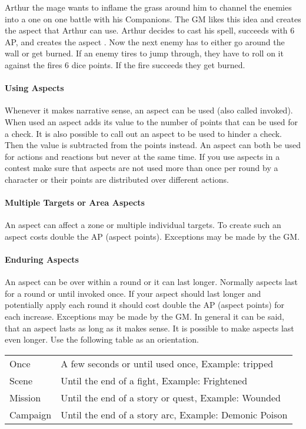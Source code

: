 \documentclass[11pt]{article}
\begin{document}
{\begin{pwexample}
Arthur the mage wants to inflame the grass around him to channel the enemies into a one on one battle with his Companions. The GM likes this idea and creates the aspect  that Arthur can use. Arthur decides to cast his spell, succeeds with 6 AP, and creates the aspect . Now the next enemy has to either go around the wall or get burned. If an enemy tires to jump through, they have to roll on it against the fires 6 dice points. If the fire succeeds they get burned.
\end{pwexample}
\paragraph*{Using Aspects}
\label{sec:orgc93d6cd}

Whenever it makes narrative sense, an aspect can be used (also called invoked). When used an aspect adds its value to the number of points that can be used for a check. It is also possible to call out an aspect to be used to hinder a check. Then the value is subtracted from the points instead. An aspect can both be used for actions and reactions but never at the same time. If you use  aspects in a contest make sure that aspects are not used more than once per round by a character or their points are distributed over different actions.
\paragraph*{Multiple Targets or Area Aspects}
\label{sec:org3c6e127}
An aspect can affect a zone or multiple individual targets. To create such an aspect costs double the AP (aspect points). Exceptions may be made by the GM. 
\paragraph*{Enduring Aspects}
\label{sec:org97ab889}
An aspect can be over within a round or it can last longer. Normally aspects last for a round or until invoked once. If your aspect should last longer and potentially apply each round it should cost double the AP (aspect points) for each increase. Exceptions may be made by the GM. In general it can be said, that an aspect lasts as long as it makes sense. It is possible to make aspects last even longer. Use the following table as an orientation.
\begin{center}
\begin{tabular}{ll}
Once & A few seconds or until used once, Example: tripped\\
Scene & Until the end of a fight, Example: Frightened\\
Mission & Until the end of a story or quest, Example: Wounded\\
Campaign & Until the end of a story arc, Example: Demonic Poison\\
\end{tabular}
\end{center}

}
\end{document}
